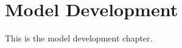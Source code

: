 \documentclass[../main.tex]{subfiles}
\begin{document}
\chapter{Model Development}

This is the model development chapter.
\end{document}
